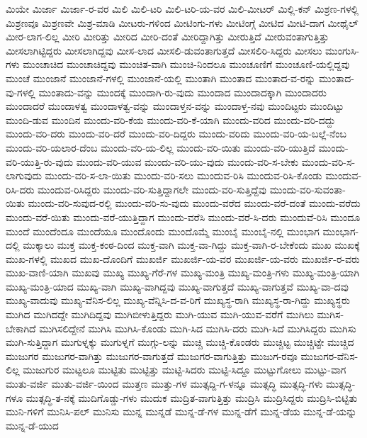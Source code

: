 {ಮಿಯೇ
ಮಿರ್ಜಾ
ಮಿರ್ಜಾ-ರ-ವರ
ಮಿಲಿ
ಮಿಲಿ-ಟರಿ
ಮಿಲಿ-ಟರಿ-ಯ-ವರ
ಮಿಲಿ-ಮೀಟರ್
ಮಿಲ್ಲಿ-ಕನ್
ಮಿಶ್ರಣ-ಗಳಲ್ಲಿ
ಮಿಶ್ರಣವೂ
ಮಿಶ್ರಣವೇ
ಮಿಶ್ರ-ಮಾಡಿ
ಮೀಟರು-ಗಳಿಂದ
ಮೀಟಿಂಗು-ಗಳು
ಮೀಟಿಂಗ್ಗೆ
ಮೀಟಿದ
ಮೀಟಿ-ದಾಗ
ಮೀಥೈಲ್
ಮೀರ-ಲಾಗ-ಲಿಲ್ಲ
ಮೀರಿ
ಮೀರಿತ್ತು
ಮೀರಿದ
ಮೀರಿ-ದಂತೆ
ಮೀರಿದ್ದಾಗಿತ್ತು
ಮೀರುತ್ತಿದೆ
ಮೀರುವಂತಾಗುತ್ತಿತ್ತು
ಮೀಸಲಾಗಿಟ್ಟಿದ್ದರು
ಮೀಸಲಾಗಿದ್ದವು
ಮೀಸ-ಲಾದ
ಮೀಸಲಿ-ಡುವಂತಾಗುತ್ತದೆ
ಮೀಸಲಿರಿ-ಸಿದ್ದರು
ಮೀಸಲು
ಮುಂಗುಸಿ-ಗಳು
ಮುಂಚಾಚಿದ
ಮುಂಚಾಚಿದ್ದವು
ಮುಂಚಿತ-ವಾಗಿ
ಮುಂಚಿ-ನಿಂದಲೂ
ಮುಂಚೂಣಿಗೆ
ಮುಂಚೂಣಿ-ಯಲ್ಲಿದ್ದವು
ಮುಂಚೆ
ಮುಂಜಾನೆ
ಮುಂಜಾನೆ-ಗಳಲ್ಲಿ
ಮುಂಜಾನೆ-ಯಲ್ಲಿ
ಮುಂತಾಗಿ
ಮುಂತಾದ
ಮುಂತಾದ-ವ-ರನ್ನು
ಮುಂತಾದ-ವು-ಗಳಲ್ಲಿ
ಮುಂತಾದು-ವನ್ನು
ಮುಂದಕ್ಕೆ
ಮುಂದಾಗಿ-ರು-ವುದು
ಮುಂದಾದ
ಮುಂದಾದಕ್ಕಾಗಿ
ಮುಂದಾದರು
ಮುಂದಾದರೆ
ಮುಂದಾಳತ್ವ
ಮುಂದಾಳತ್ವ-ವನ್ನು
ಮುಂದಾಳ್ತನ-ವನ್ನು
ಮುಂದಾಳ್ತ-ನವು
ಮುಂದಿಟ್ಟರು
ಮುಂದಿಟ್ಟು
ಮುಂದಿ-ಡುವ
ಮುಂದಿನ
ಮುಂದು-ವರಿ-ಕೆಯ
ಮುಂದು-ವರಿ-ಕೆ-ಯಾಗಿ
ಮುಂದು-ವರಿದ
ಮುಂದು-ವರಿ-ದದ್ದು
ಮುಂದು-ವರಿ-ದರು
ಮುಂದು-ವರಿ-ದರೆ
ಮುಂದು-ವರಿ-ದಿದ್ದರು
ಮುಂದು-ವರಿದು
ಮುಂದು-ವರಿ-ಯ-ಬಲ್ಲೆ-ನೆಂಬ
ಮುಂದು-ವರಿ-ಯಲಾರ-ದೆಂಬ
ಮುಂದು-ವರಿ-ಯ-ಲಿಲ್ಲ
ಮುಂದು-ವರಿ-ಯಿತು
ಮುಂದು-ವರಿ-ಯುತ್ತಿದೆ
ಮುಂದು-ವರಿ-ಯುತ್ತಿ-ರು-ವುದು
ಮುಂದು-ವರಿ-ಯುವ
ಮುಂದು-ವರಿ-ಯು-ವುದು
ಮುಂದು-ವರಿ-ಸ-ಬೇಕು
ಮುಂದು-ವರಿ-ಸ-ಲಾಗುವುದು
ಮುಂದು-ವರಿ-ಸ-ಲಾ-ಯಿತು
ಮುಂದು-ವರಿ-ಸಲು
ಮುಂದುವ-ರಿಸಿ
ಮುಂದುವ-ರಿಸಿ-ಕೊಂಡು
ಮುಂದುವ-ರಿಸಿ-ದರು
ಮುಂದುವ-ರಿಸಿದ್ದರು
ಮುಂದು-ವರಿ-ಸುತ್ತಿದ್ದಾಗಲೇ
ಮುಂದು-ವರಿ-ಸುತ್ತಿದ್ದೆವು
ಮುಂದು-ವರಿ-ಸುವಂತಾ-ಯಿತು
ಮುಂದು-ವರಿ-ಸುವುದ-ರಲ್ಲಿ
ಮುಂದು-ವರಿ-ಸು-ವುದು
ಮುಂದು-ವರೆದ
ಮುಂದು-ವರೆ-ದಂತೆ
ಮುಂದು-ವರೆದು
ಮುಂದು-ವರೆ-ಯಿತು
ಮುಂದು-ವರೆ-ಯುತ್ತಿದ್ದಾಗ
ಮುಂದು-ವರೆಸಿ
ಮುಂದು-ವರೆ-ಸಿ-ದರು
ಮುಂದುವೆ-ರಿಸಿ
ಮುಂದೂ
ಮುಂದೆ
ಮುಂದೆಂದೂ
ಮುಂದೆಯೂ
ಮುಂದೊಂದು
ಮುಂದೊಮ್ಮೆ
ಮುಂಬೈ
ಮುಂಬೈ-ನಲ್ಲಿ
ಮುಂಭಾಗ
ಮುಂಭಾಗ-ದಲ್ಲಿ
ಮುಕ್ಕಾಲು
ಮುಕ್ತ
ಮುಕ್ತ-ಕಂಠ-ದಿಂದ
ಮುಕ್ತ-ವಾಗಿ
ಮುಕ್ತ-ವಾ-ಗಿದ್ದು
ಮುಕ್ತ-ವಾಗಿ-ರ-ಬೇಕೆಂದು
ಮುಖ
ಮುಖಕ್ಕೆ
ಮುಖ-ಗಳಲ್ಲಿ
ಮುಖದ
ಮುಖ-ದೊಂದಿಗೆ
ಮುಖರ್ಜಿ
ಮುಖರ್ಜಿ-ಯ-ವರ
ಮುಖರ್ಜಿ-ಯ-ವರು
ಮುಖರ್ಜಿ-ರ-ವರು
ಮುಖ-ವಾಣಿ-ಯಾಗಿ
ಮುಖವು
ಮುಖ್ಯ
ಮುಖ್ಯ-ಗೆರೆ-ಗಳ
ಮುಖ್ಯ-ಮಂತ್ರಿ
ಮುಖ್ಯ-ಮಂತ್ರಿ-ಗಳು
ಮುಖ್ಯ-ಮಂತ್ರಿ-ಯಾಗಿ
ಮುಖ್ಯ-ಮಂತ್ರಿ-ಯಾದ
ಮುಖ್ಯ-ವಾಗಿ
ಮುಖ್ಯ-ವಾಗಿದ್ದವು
ಮುಖ್ಯ-ವಾಗುತ್ತದೆ
ಮುಖ್ಯ-ವಾಗುತ್ತವೆ
ಮುಖ್ಯ-ವಾ-ದವು
ಮುಖ್ಯ-ವಾದುವು
ಮುಖ್ಯ-ವೆನಿಸ-ಲಿಲ್ಲ
ಮುಖ್ಯ-ವೆನ್ನಿಸಿ-ದ-ವ-ರಿಗೆ
ಮುಖ್ಯಸ್ಥ-ರಾಗಿ
ಮುಖ್ಯಸ್ಥ-ರಾ-ಗಿದ್ದು
ಮುಖ್ಯಸ್ಥರು
ಮುಗಿದ
ಮುಗಿದದ್ದೇ
ಮುಗಿದಿದ್ದವು
ಮುಗಿಬೀಳುತ್ತಿದ್ದರು
ಮುಗಿ-ಯುವ
ಮುಗಿ-ಯುವ-ವರೆಗೆ
ಮುಗಿಲು
ಮುಗಿಸ-ಬೇಕಾಗಿದೆ
ಮುಗಿಸಲಿದ್ದೇನೆ
ಮುಗಿಸಿ
ಮುಗಿಸಿ-ಕೊಂಡು
ಮುಗಿ-ಸಿದ
ಮುಗಿಸಿ-ದರು
ಮುಗಿ-ಸಿದೆ
ಮುಗಿಸಿದ್ದರು
ಮುಗಿಸು
ಮುಗಿ-ಸುತ್ತಿದ್ದಾಗ
ಮುಗುಳ್ನಕ್ಕು
ಮುಗುಳ್ನಗೆ
ಮುಗ್ಗು-ಲನ್ನು
ಮುಚ್ಚಿ
ಮುಚ್ಚಿ-ಕೊಂಡರು
ಮುಚ್ಚಿಟ್ಟ
ಮುಚ್ಚಿಟ್ಟೇ
ಮುಚ್ಚಿದ
ಮುಜುಗರ
ಮುಜುಗರ-ವಾಗಿತ್ತು
ಮುಜುಗರ-ವಾಗುತ್ತದೆ
ಮುಜುಗರ-ವಾಗುತ್ತಿತ್ತು
ಮುಜುಗ-ರವೂ
ಮುಜುಗರ-ವೆನಿಸ-ಲಿಲ್ಲ
ಮುಜುಗುರ
ಮುಟ್ಟಲೂ
ಮುಟ್ಟಿತು
ಮುಟ್ಟಿತ್ತು
ಮುಟ್ಟಿ-ಸಿದರು
ಮುಟ್ಟಿ-ಸಿದ್ದೂ
ಮುಟ್ಟುಗೋಲು
ಮುಟ್ಟು-ವಾಗ
ಮುತು-ವರ್ಜಿ
ಮುತು-ವರ್ಜಿ-ಯಿಂದ
ಮುತ್ತಣ
ಮುತ್ತು-ಗಳ
ಮುತ್ಸದ್ದಿ-ಗ-ಳನ್ನೂ
ಮುತ್ಸದ್ಧಿ
ಮುತ್ಸದ್ಧಿ-ಗಳು
ಮುತ್ಸದ್ಧಿ-ಗಳೂ
ಮುತ್ಸದ್ಧಿ-ತ-ನಕ್ಕೆ
ಮುದಿಗೊಡ್ಡು-ಗಳು
ಮುದುಕ
ಮುದ್ರಿತ-ವಾಗುತ್ತಿತ್ತು
ಮುದ್ರಿಸಿ
ಮುದ್ರಿಸಿದ್ದರು
ಮುದ್ರಿಸಿ-ಬಿಟ್ಟಿತು
ಮುನಿ-ಗಳಿಗೆ
ಮುನಿಸಿ-ಪಲ್
ಮುನಿಸು
ಮುನ್ನ
ಮುನ್ನಡೆ
ಮುನ್ನ-ಡೆ-ಗಳ
ಮುನ್ನ-ಡೆಗೆ
ಮುನ್ನ-ಡೆಯ
ಮುನ್ನ-ಡೆ-ಯನ್ನು
ಮುನ್ನ-ಡೆ-ಯುದ
}
